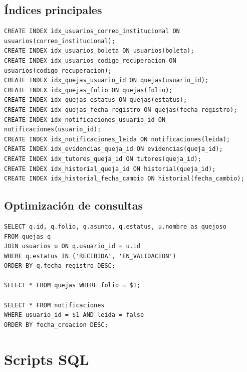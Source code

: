 \documentclass[11pt,letterpaper]{article}
\begin{document}
\subsection{Índices principales}
\begin{lstlisting}
CREATE INDEX idx_usuarios_correo_institucional ON usuarios(correo_institucional);
CREATE INDEX idx_usuarios_boleta ON usuarios(boleta);
CREATE INDEX idx_usuarios_codigo_recuperacion ON usuarios(codigo_recuperacion);
CREATE INDEX idx_quejas_usuario_id ON quejas(usuario_id);
CREATE INDEX idx_quejas_folio ON quejas(folio);
CREATE INDEX idx_quejas_estatus ON quejas(estatus);
CREATE INDEX idx_quejas_fecha_registro ON quejas(fecha_registro);
CREATE INDEX idx_notificaciones_usuario_id ON notificaciones(usuario_id);
CREATE INDEX idx_notificaciones_leida ON notificaciones(leida);
CREATE INDEX idx_evidencias_queja_id ON evidencias(queja_id);
CREATE INDEX idx_tutores_queja_id ON tutores(queja_id);
CREATE INDEX idx_historial_queja_id ON historial(queja_id);
CREATE INDEX idx_historial_fecha_cambio ON historial(fecha_cambio);
\end{lstlisting}

\subsection{Optimización de consultas}
\begin{lstlisting}
SELECT q.id, q.folio, q.asunto, q.estatus, u.nombre as quejoso
FROM quejas q
JOIN usuarios u ON q.usuario_id = u.id
WHERE q.estatus IN ('RECIBIDA', 'EN_VALIDACION')
ORDER BY q.fecha_registro DESC;

SELECT * FROM quejas WHERE folio = $1;

SELECT * FROM notificaciones 
WHERE usuario_id = $1 AND leida = false 
ORDER BY fecha_creacion DESC;
\end{lstlisting}

\section{Scripts SQL}
\end{document}
